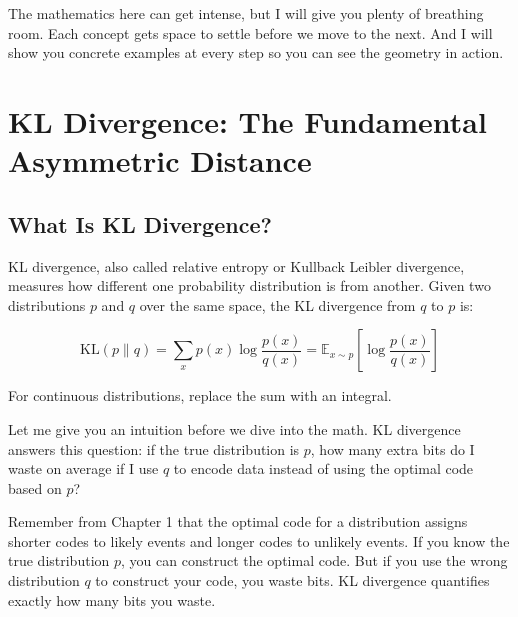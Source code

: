 The mathematics here can get intense, but I will give you plenty of breathing room. Each concept gets space to settle before we move to the next. And I will show you concrete examples at every step so you can see the geometry in action.

\vspace{2em}

\section{KL Divergence: The Fundamental Asymmetric Distance}

\subsection{What Is KL Divergence?}

KL divergence, also called relative entropy or Kullback Leibler divergence, measures how different one probability distribution is from another. Given two distributions $p$ and $q$ over the same space, the KL divergence from $q$ to $p$ is:

\begin{equation}
\text{KL}(p \| q) = \sum_{x} p(x) \log \frac{p(x)}{q(x)} = \mathbb{E}_{x \sim p}\left[\log \frac{p(x)}{q(x)}\right]
\end{equation}

For continuous distributions, replace the sum with an integral.

Let me give you an intuition before we dive into the math. KL divergence answers this question: if the true distribution is $p$, how many extra bits do I waste on average if I use $q$ to encode data instead of using the optimal code based on $p$?

\vspace{1em}

Remember from Chapter 1 that the optimal code for a distribution assigns shorter codes to likely events and longer codes to unlikely events. If you know the true distribution $p$, you can construct the optimal code. But if you use the wrong distribution $q$ to construct your code, you waste bits. KL divergence quantifies exactly how many bits you waste.

\vspace{1.5em}

